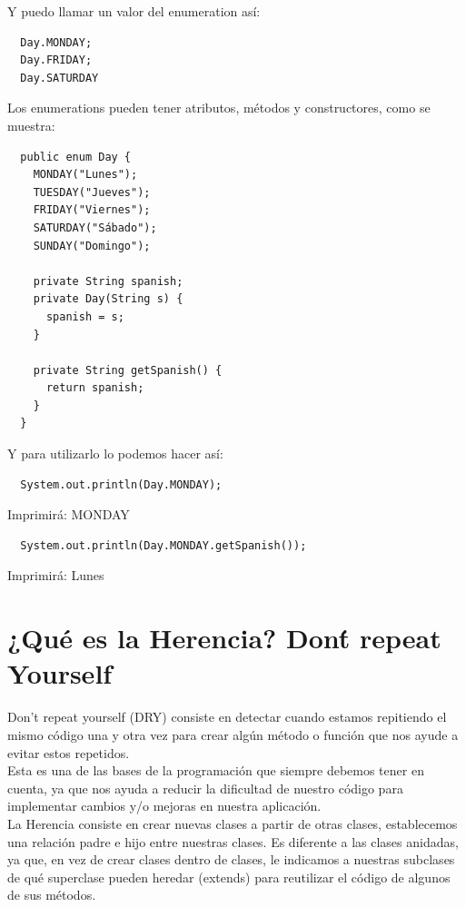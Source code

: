\documentclass{article}
\begin{document}
Y puedo llamar un valor del enumeration así:\\

\begin{verbatim}
  Day.MONDAY;
  Day.FRIDAY;
  Day.SATURDAY
\end{verbatim}

Los enumerations pueden tener atributos, métodos y constructores, como se
muestra:\\

\begin{verbatim}
  public enum Day {
    MONDAY("Lunes");
    TUESDAY("Jueves");
    FRIDAY("Viernes");
    SATURDAY("Sábado");
    SUNDAY("Domingo");

    private String spanish;
    private Day(String s) {
      spanish = s;
    }

    private String getSpanish() {
      return spanish;
    }
  }
\end{verbatim}

Y para utilizarlo lo podemos hacer así:\\

\begin{verbatim}
  System.out.println(Day.MONDAY);
\end{verbatim}

Imprimirá: MONDAY\\

\begin{verbatim}
  System.out.println(Day.MONDAY.getSpanish());
\end{verbatim}

Imprimirá: Lunes\\


\section{¿Qué es la Herencia? Don\'t repeat Yourself}%
Don’t repeat yourself (DRY) consiste en detectar cuando estamos repitiendo el
mismo código una y otra vez para crear algún método o función que nos ayude a
evitar estos repetidos.\\

Esta es una de las bases de la programación que siempre debemos tener en
cuenta, ya que nos ayuda a reducir la dificultad de nuestro código para
implementar cambios y/o mejoras en nuestra aplicación.\\

La Herencia consiste en crear nuevas clases a partir de otras clases,
establecemos una relación padre e hijo entre nuestras clases. Es diferente a
las clases anidadas, ya que, en vez de crear clases dentro de clases, le
indicamos a nuestras subclases de qué superclase pueden heredar (extends) para
reutilizar el código de algunos de sus métodos.\\
\end{document}
